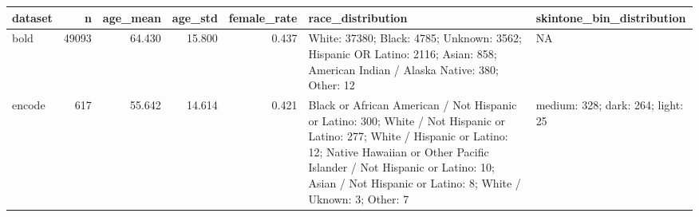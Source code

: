 \begin{tabular}{lrrrrll}
\toprule
dataset & n & age\_mean & age\_std & female\_rate & race\_distribution & skintone\_bin\_distribution \\
\midrule
bold & 49093 & 64.430 & 15.800 & 0.437 & White: 37380; Black: 4785; Unknown: 3562; Hispanic OR Latino: 2116; Asian: 858; American Indian / Alaska Native: 380; Other: 12 & NA \\
encode & 617 & 55.642 & 14.614 & 0.421 & Black or African American / Not Hispanic or Latino: 300; White / Not Hispanic or Latino: 277; White / Hispanic or Latino: 12; Native Hawaiian or Other Pacific Islander / Not Hispanic or Latino: 10; Asian / Not Hispanic or Latino: 8; White / Uknown: 3; Other: 7 & medium: 328; dark: 264; light: 25 \\
\bottomrule
\end{tabular}
